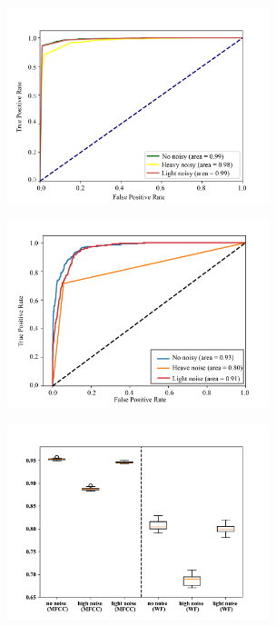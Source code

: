 \documentclass[12pt]{article}
\begin{document}
\begin{multicols*}{2}
{
    \centering
    \includegraphics[width=3in]{figures/MFCC_7labels.jpg}
    \label{figure:mfcc}
}

{
    \centering
    \includegraphics[width=3in]{figures/WF_7labels.jpg}
    \label{figure:wf}
}

{
    \centering
    \includegraphics[width=3in]{figures/Accuracy.jpg}
    \label{accuracy}
}


\end{multicols*}
\end{document}
